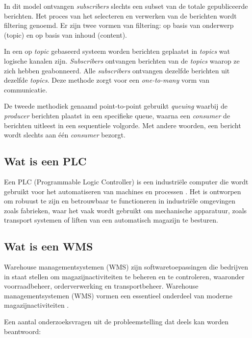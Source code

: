 In dit model ontvangen \emph{subscribers} slechts een subset van de totale gepubliceerde berichten. 
Het proces van het selecteren en verwerken van de berichten wordt filtering genoemd. 
Er zijn twee vormen van filtering: op basis van onderwerp (topic) en op basis van inhoud (content).
\newline

In een op \emph{topic} gebaseerd systeem worden berichten geplaatst in \emph{topics} wat logische kanalen zijn.
\emph{Subscribers} ontvangen berichten van de \emph{topics} waarop ze zich hebben geabonneerd.
Alle \emph{subscribers} ontvangen dezelfde berichten uit dezelfde \emph{topics}. 
Deze methode zorgt voor een \emph{one-to-many} vorm van communicatie.
\newline

De tweede methodiek genaamd point-to-point gebruikt \emph{queuing} waarbij de \emph{producer} berichten plaatst in een specifieke queue, 
waarna een \emph{consumer} de berichten uitleest in een sequentiele volgorde. 
Met andere woorden, een bericht wordt slechts aan één \emph{consumer} bezorgt.

\subsection{Wat is een PLC}
Een PLC (Programmable Logic Controller) is een industriële computer die wordt gebruikt voor het automatiseren van machines en processen \autocite{Bolton2015}. 
Het is ontworpen om robuust te zijn en betrouwbaar te functioneren in industriële omgevingen zoals fabrieken, 
waar het vaak wordt gebruikt om mechanische apparatuur, zoals transport systemen of liften van een automatisch magazijn te besturen.

\subsection{Wat is een WMS}
Warehouse managementsystemen (WMS) zijn softwaretoepassingen die bedrijven in staat stellen om magazijnactiviteiten te beheren en te controleren, 
waaronder voorraadbeheer, orderverwerking en transportbeheer. 
Warehouse managementsystemen (WMS) vormen een essentieel onderdeel van moderne magazijnactiviteiten \autocite{Rana2023}. \newline

Een aantal onderzoeksvragen uit de probleemstelling dat deels kan worden beantwoord:

